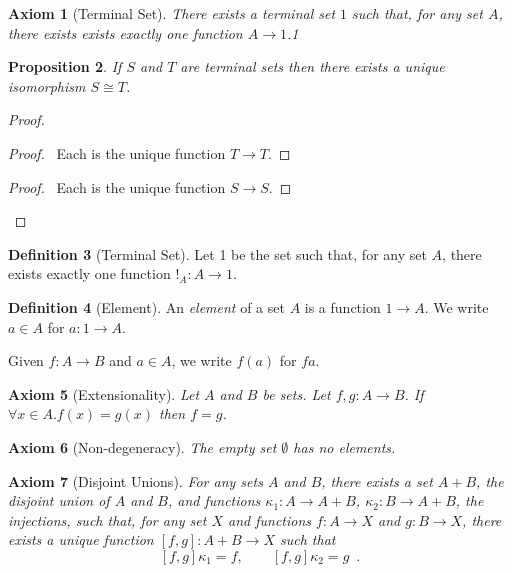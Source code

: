 \documentclass{book}
\let\qed\relax
\newtheorem{ax}{Axiom}[chapter]
\newtheorem{prop}[ax]{Proposition}
\theoremstyle{definition}
\newtheorem{df}[ax]{Definition}
\begin{document}
\begin{ax}[Terminal Set]
There exists a \emph{terminal} set $1$ such that, for any set $A$, there exists exists exactly one function $A \rightarrow 1$.1
\end{ax}

\begin{prop}
If $S$ and $T$ are terminal sets then there exists a unique isomorphism $S \cong T$.
\end{prop}

\begin{proof}
\pf
{}
\begin{proof}
	\pf\ Each is the unique function $T \rightarrow T$.
\end{proof}
\begin{proof}
	\pf\ Each is the unique function $S \rightarrow S$.
\end{proof}
\qed
\end{proof}

\begin{df}[Terminal Set]
Let 1 be the set such that, for any set $A$, there exists exactly one function $!_A : A \rightarrow 1$.
\end{df}

\begin{df}[Element]
An \emph{element} of a set $A$ is a function $1 \rightarrow A$. We write $a \in A$ for $a : 1 \rightarrow A$.

Given $f : A \rightarrow B$ and $a \in A$, we write $f(a)$ for $fa$.
\end{df}

\begin{ax}[Extensionality]
Let $A$ and $B$ be sets. Let $f,g : A \rightarrow B$. If $\forall x \in A. f(x) = g(x)$ then $f = g$.
\end{ax}

\begin{ax}[Non-degeneracy]
The empty set $\emptyset$ has no elements.
\end{ax}

\begin{ax}[Disjoint Unions]
For any sets $A$ and $B$, there exists a set $A + B$, the \emph{disjoint union} of $A$ and $B$, and functions $\kappa_1 : A \rightarrow A + B$, $\kappa_2 : B \rightarrow A + B$, the \emph{injections}, such that, for any set $X$ and functions $f : A \rightarrow X$ and $g : B \rightarrow X$, there exists a unique function $[f,g] : A + B \rightarrow X$ such that
\[ [f,g] \kappa_1 = f, \qquad [f,g] \kappa_2 = g \enspace . \]
\end{ax}
\end{document}
